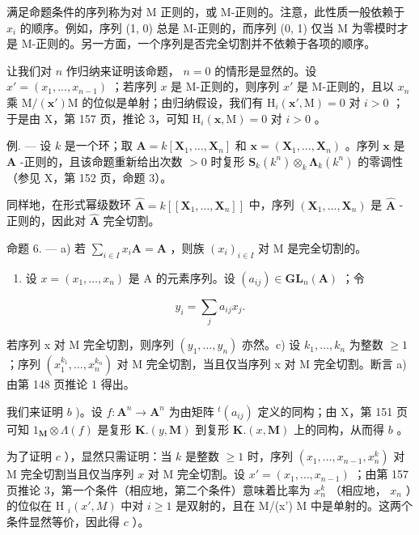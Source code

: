 满足命题条件的序列称为对 M 正则的，或 M-正则的。注意，此性质一般依赖于 \(x_i\) 的顺序。例如，序列 (1, 0) 总是 M-正则的，而序列 (0, 1) 仅当 M 为零模时才是 M-正则的。另一方面，一个序列是否完全切割并不依赖于各项的顺序。

让我们对 \(n\) 作归纳来证明该命题， \(n=0\) 的情形是显然的。设 \(x'=(x_{1},...,x_{n-1})\) ；若序列 \(x\) 是 M-正则的，则序列 \(x'\) 是 M-正则的，且以 \(x_{n}\) 乘 \(\mathrm{M}/(\mathbf{x}')\mathrm{M}\) 的位似是单射；由归纳假设，我们有 \(\mathrm{H}_{i}(\mathbf{x}',\mathrm{M})=0\) 对 \(i>0\) ；于是由 X，第 157 页，推论 3，可知 \(\mathrm{H}_{i}(\mathbf{x},\mathrm{M})=0\) 对 \(i>0\) 。

例. --- 设 \(k\) 是一个环；取 \(\mathbf{A} = k[\mathbf{X}_1, \ldots, \mathbf{X}_n]\) 和 \(\boldsymbol{x} = (\mathbf{X}_1, \ldots, \mathbf{X}_n)\) 。序列 \(\boldsymbol{x}\) 是 \(\mathbf{A}\) -正则的，且该命题重新给出次数 \(>0\) 时复形 \(\mathbf{S}_k(k^n) \otimes_k \boldsymbol{\Lambda}_k(k^n)\) 的零调性（参见 X，第 152 页，命题 3）。

同样地，在形式幂级数环 \(\hat{\mathbf{A}} = k[[\mathbf{X}_1, \ldots, \mathbf{X}_n]]\) 中，序列 \((\mathbf{X}_1, \ldots, \mathbf{X}_n)\) 是 \(\hat{\mathbf{A}}\) -正则的，因此对 \(\hat{\mathbf{A}}\) 完全切割。

命题 6. --- a) 若 \(\sum_{i\in I}x_i\mathbf{A} = \mathbf{A}\) ，则族 \((x_i)_{i\in I}\) 对 M 是完全切割的。

\begin{enumerate}
\def\labelenumi{\alph{enumi})}
\setcounter{enumi}{1}
\tightlist
\item
  设 \(x = (x_1, \ldots, x_n)\) 是 A 的元素序列。设 \((a_{ij}) \in \mathbf{GL}_n(\mathbf{A})\) ；令
\end{enumerate}

\[
y _ {i} = \sum_ {j} a _ {i j} x _ {j}.
\]

若序列 x 对 M 完全切割，则序列 \((y_{1}, \ldots, y_{n})\) 亦然。c) 设 \(k_{1}, \ldots, k_{n}\) 为整数 \(\geqslant 1\) ；序列 \((x_{1}^{k_{1}}, \ldots, x_{n}^{k_{n}})\) 对 M 完全切割，当且仅当序列 x 对 M 完全切割。断言 a) 由第 148 页推论 1 得出。

我们来证明 \(b\) )。设 \(f: \mathbf{A}^n \to \mathbf{A}^n\) 为由矩阵 \(^t(a_{ij})\) 定义的同构；由 X，第 151 页可知 \(1_{\mathbf{M}} \otimes \Lambda(f)\) 是复形 \(\mathbf{K}.(y, \mathbf{M})\) 到复形 \(\mathbf{K}.(x, \mathbf{M})\) 上的同构，从而得 \(b\) 。

为了证明 \(c\) ），显然只需证明：当 \(k\) 是整数 \(\geqslant 1\) 时，序列 \((x_{1}, \ldots, x_{n-1}, x_{n}^{k})\) 对 M 完全切割当且仅当序列 \(x\) 对 M 完全切割。设 \(x' = (x_{1}, \ldots, x_{n-1})\) ；由第 157 页推论 3，第一个条件（相应地，第二个条件）意味着比率为 \(x_{n}^{k}\) （相应地， \(x_{n}\) ）的位似在 H \(_{i}(x', M)\) 中对 \(i \geqslant 1\) 是双射的，且在 M/(x') M 中是单射的。这两个条件显然等价，因此得 \(c\) ）。

